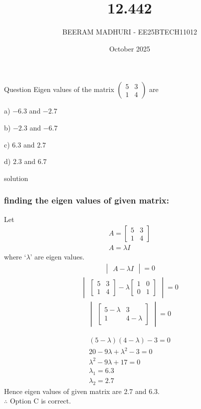 \documentclass{beamer}
\title %
{12.442}
\date{October  2025}
\author %
{BEERAM MADHURI - EE25BTECH11012}
\begin{document}
\frame{\titlepage}
\begin{frame}{Question}
 Eigen values of the matrix
$\begin{pmatrix}5 & 3 \\1 & 4\end{pmatrix}$
are

\begin{enumerate}
\begin{multicols}{4}
\item [a)] $-6.3$ and $-2.7$
\item [b)] $-2.3$ and $-6.7$
\item [c)] $6.3$ and $2.7$
\item [d)] $2.3$ and $6.7$
\end{multicols}
\end{enumerate}
\end{frame}
 
\begin{frame}{solution}
    \frametitle{finding the eigen values of given matrix:}
Let 
\begin{align}
A = \begin{bmatrix} 5 & 3 \\ 1 & 4 \end{bmatrix}\\
A = \lambda I
\end{align}
where `$\lambda$' are eigen values.
\begin{align}
\begin{vmatrix} A - \lambda I \end{vmatrix} = 0
\end{align}
\begin{align}
\begin{vmatrix} \begin{bmatrix} 5 & 3 \\ 1 & 4 \end{bmatrix} - \lambda \begin{bmatrix} 1 & 0 \\ 0 & 1 \end{bmatrix} \end{vmatrix} = 0
\end{align}
\begin{align}
\begin{vmatrix} \begin{bmatrix} 5-\lambda & 3 \\ 1 & 4-\lambda \end{bmatrix} \end{vmatrix} = 0
\end{align}
\end{frame}
\begin{frame}
\begin{align}
(5-\lambda)(4-\lambda) - 3 = 0\\
20 - 9\lambda + \lambda^2 - 3 = 0\\
\lambda^2 - 9\lambda + 17 = 0\\
\lambda_1 = 6.3\\
\lambda_2 = 2.7
\end{align}
Hence eigen values of given matrix are 2.7 and 6.3.\\
$\therefore$ Option C is correct.
\end{frame}
\end{document}
